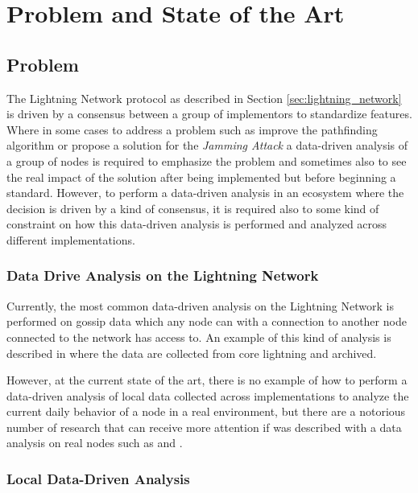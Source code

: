 \chapter{Problem and State of the Art}
\label{sec:problem_and_state_of_the_art}

\section{Problem}

The Lightning Network protocol as described in Section \ref{sec:lightning_network} is 
driven by a consensus between a group of implementors to standardize
features. Where in some cases to address a problem such as 
improve the pathfinding algorithm\cite{DBLP:journals/corr/abs-2103-08576} or 
propose a solution for the \emph{Jamming Attack}\cite{cryptoeprint:2022/1454} 
a data-driven analysis of a group of nodes is required to emphasize the
problem and sometimes also to see the real impact of the solution after being 
implemented but before beginning a standard.
However, to perform a data-driven analysis in an ecosystem where the decision
is driven by a kind of consensus, it is required also to some kind of 
constraint on how this data-driven analysis is performed and analyzed across 
different implementations.

\subsection{Data Drive Analysis on the Lightning Network}

Currently, the most common data-driven analysis on the Lightning Network is performed 
on gossip data which any node can with a connection to another node connected 
to the network has access to. An example of this kind of analysis is described in \cite{lngossip}
where the data are collected from core lightning and archived.

However, at the current state of the art, there is no example of how to perform
a data-driven analysis of local data collected across implementations to 
analyze the current daily behavior of a node in a real environment, but there
are a notorious number of research that can receive more attention if was 
described with a data analysis on real nodes such as \cite{DBLP:journals/corr/abs-2103-08576} 
and \cite{cryptoeprint:2022/1454}.


\subsection{Local Data-Driven Analysis}

